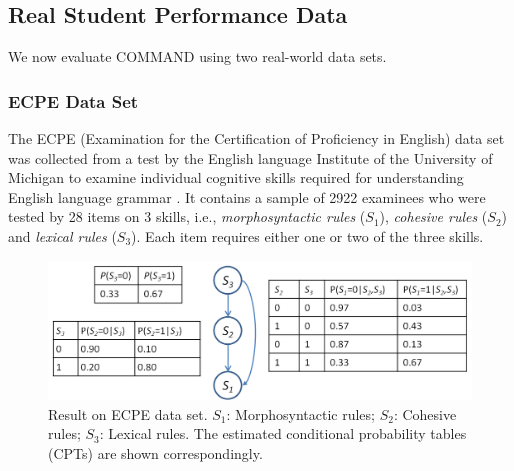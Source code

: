 \documentclass{edm_template}
\begin{document}
	\subsection{Real Student Performance Data}
	\label{sec:real}
	We now evaluate COMMAND using two real-world data sets.	
	
	\subsubsection{ECPE Data Set}
	The ECPE (Examination for the Certification of Proficiency in English) data set was collected from a test by the English language Institute
	of the University of Michigan to examine individual cognitive skills required for understanding English language grammar \cite{templin2014hierarchical}.
	It contains a sample of 2922 examinees who were tested by 28 items on 3 skills, i.e., \emph{morphosyntactic rules} ($S_1$), \emph{cohesive rules} ($S_2$) 
	and \emph{lexical rules} ($S_3$). Each item requires either one or two of the three skills.
	
				\begin{figure}[!th]
					\begin{center}
						\centering
						\includegraphics[width=0.95\linewidth]{figures/ecpe_results.png}
					\end{center}
					\vspace{-1em}
					\caption{Result on ECPE data set. $S_1$: Morphosyntactic rules; $S_2$: Cohesive rules; $S_3$: Lexical rules. 
						The estimated conditional probability tables (CPTs) are shown correspondingly.}
					\label{fig:ecpe-result} 
				\end{figure}
					 				
\end{document}

